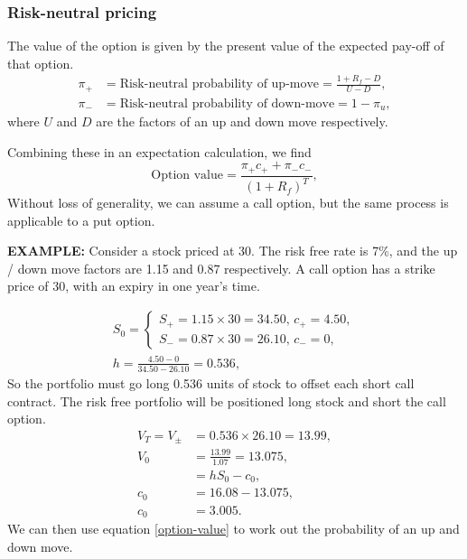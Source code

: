 \documentclass[../notes_compiled.tex]{subfiles}
\begin{document}
\subsubsection{Risk-neutral pricing}
\begin{itemize}
\item The value of the option is given by the present value of the expected pay-off of that option.
\begin{align}
\pi_{+}&=\text{Risk-neutral probability of up-move}=\frac{1+R_{f}-D}{U-D}, \label{pi-plus} \\
\pi_{-}&=\text{Risk-neutral probability of down-move}=1-\pi_{u}, \label{pi-minus}
\end{align}
where $U$ and $D$ are the factors of an up and down move respectively.
\item[] Combining these in an expectation calculation, we find
\begin{equation}
\text{Option value} = \frac{\pi_{+}c_{+} + \pi_{-}c_{-}}{(1+R_{f})^{T}}, \label{option-value}
\end{equation}
Without loss of generality, we can assume a call option, but the same process is applicable to a put option.
{\color{RedViolet}
\item[] \textbf{EXAMPLE:} Consider a stock priced at 30. The risk free rate is 7\%, and the up / down move factors are 1.15 and 0.87 respectively. A call option has a strike price of 30, with an expiry in one year’s time.
}
{\color{RoyalBlue}
\begin{align*}
S_{0}=\begin{cases}S_{+} = 1.15\times30=34.50\text{, }c_{+}=4.50, \\ S_{-} = 0.87\times30=26.10\text{, }c_{-}=0,\end{cases} \\
h=\frac{4.50-0}{34.50-26.10}=0.536,
\end{align*}
So the portfolio must go long 0.536 units of stock to offset each short call contract. The risk free portfolio will be positioned long stock and short the call option.
\begin{align*}
V_{T}=V_{\pm}&=0.536\times26.10=13.99 ,\\
V_{0}&=\frac{13.99}{1.07}=13.075, \\
&=hS_{0}-c_{0}, \\
c_{0}&=16.08-13.075, \\
c_{0}&=3.005.
\end{align*}
We can then use equation \ref{option-value} to work out the probability of an up and down move.
}
\end{itemize}
\end{document}
